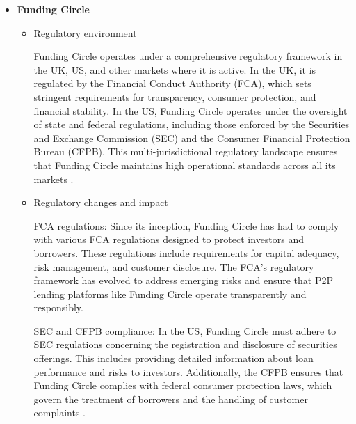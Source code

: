 \documentclass{article}
\begin{document}
\begin{itemize}
\begin{itemize}
        Closure of P2P Lending: In December 2021, Zopa decided to close its P2P lending operations to focus entirely on its banking business. This decision was influenced by increased regulatory costs and a desire to streamline operations under the banking framework. The FCA's evolving regulatory landscape and the need for higher operational standards were significant factors in this strategic shift.

    \end{itemize}
      
   \item \textbf{Funding Circle}
    \begin{itemize}
        \item Regulatory environment

        Funding Circle operates under a comprehensive regulatory framework in the UK, US, and other markets where it is active. In the UK, it is regulated by the Financial Conduct Authority (FCA), which sets stringent requirements for transparency, consumer protection, and financial stability. In the US, Funding Circle operates under the oversight of state and federal regulations, including those enforced by the Securities and Exchange Commission (SEC) and the Consumer Financial Protection Bureau (CFPB). This multi-jurisdictional regulatory landscape ensures that Funding Circle maintains high operational standards across all its markets \citep{fca_home_2023}.

        \item Regulatory changes and impact

        FCA regulations: Since its inception, Funding Circle has had to comply with various FCA regulations designed to protect investors and borrowers. These regulations include requirements for capital adequacy, risk management, and customer disclosure. The FCA's regulatory framework has evolved to address emerging risks and ensure that P2P lending platforms like Funding Circle operate transparently and responsibly.
        
        SEC and CFPB compliance: In the US, Funding Circle must adhere to SEC regulations concerning the registration and disclosure of securities offerings. This includes providing detailed information about loan performance and risks to investors. Additionally, the CFPB ensures that Funding Circle complies with federal consumer protection laws, which govern the treatment of borrowers and the handling of customer complaints \citep{cfpb_supervision_2023}.
        

\end{itemize}
\end{itemize}
\end{document}
